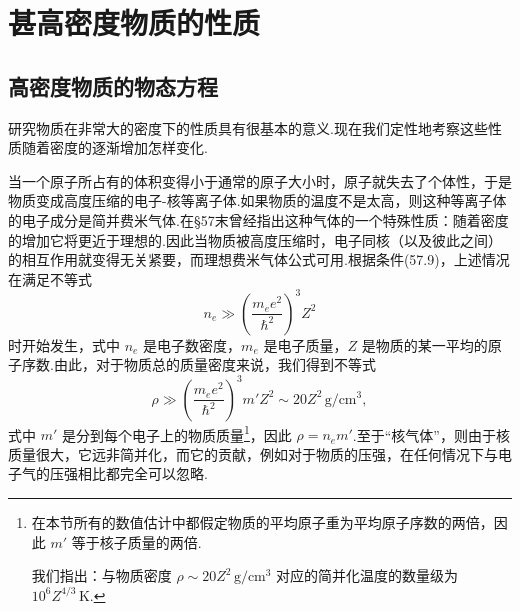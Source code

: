 %
\chapter{甚高密度物质的性质}

\section{高密度物质的物态方程}

研究物质在非常大的密度下的性质具有很基本的意义.现在我们定性地考察这些性质随着密度的逐渐增加怎样变化.

当一个原子所占有的体积变得小于通常的原子大小时，原子就失去了个体性，于是物质变成高度压缩的电子-核等离子体.如果物质的温度不是太高，则这种等离子体的电子成分是简并费米气体.在§57末曾经指出这种气体的一个特殊性质：随着密度的增加它将更近于理想的.因此当物质被高度压缩时，电子同核（以及彼此之间）的相互作用就变得无关紧要，而理想费米气体公式可用.根据条件(57.9)，上述情况在满足不等式
\begin{equation*}
  n_e\gg\left(\frac{m_ee^2}{\hbar^2}\right)^3Z^2
\end{equation*}
时开始发生，式中 $n_e$ 是电子数密度，$m_e$ 是电子质量，$Z$ 是物质的某一平均的原子序数.由此，对于物质总的质量密度来说，我们得到不等式
\begin{equation}
  \rho\gg\left(\frac{m_ee^2}{\hbar^2}\right)^3m'Z^2
  \sim20Z^2\,\mathrm{g/cm^3},
\end{equation}
式中 $m'$ 是分到每个电子上的物质质量\footnote{在本节所有的数值估计中都假定物质的平均原子重为平均原子序数的两倍，因此 $m'$ 等于核子质量的两倍.\par\noindent 我们指出：与物质密度 $\rho\sim20Z^{2}\,\mathrm{g/cm^{3}}$ 对应的简并化温度的数量级为 $10^{6}Z^{4/3}\,\mathrm{K}$.}，因此 $\rho=n_em'$.至于“核气体”，则由于核质量很大，它远非简并化，而它的贡献，例如对于物质的压强，在任何情况下与电子气的压强相比都完全可以忽略.

